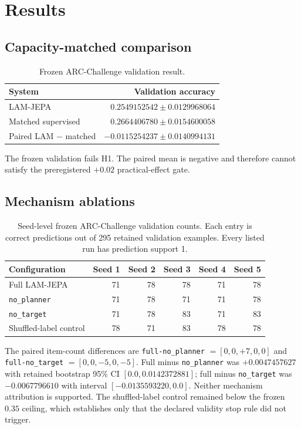 \documentclass{article}
\begin{document}
\section{Results}
\subsection{Capacity-matched comparison}
\begin{table}[t]
\centering
\caption{Frozen ARC-Challenge validation result.}
\begin{tabular}{lr}
\toprule
System & Validation accuracy \\
\midrule
LAM-JEPA & $0.2549152542 \pm 0.0129968064$ \\
Matched supervised & $0.2664406780 \pm 0.0154600058$ \\
Paired LAM $-$ matched & $-0.0115254237 \pm 0.0140994131$ \\
\bottomrule
\end{tabular}
\end{table}
The frozen validation fails H1. The paired mean is negative and therefore cannot satisfy the preregistered $+0.02$ practical-effect gate.

\subsection{Mechanism ablations}
\begin{table}[t]
\centering
\caption{Seed-level frozen ARC-Challenge validation counts. Each entry is correct predictions out of 295 retained validation examples. Every listed run has prediction support 1.}
\begin{tabular}{lrrrrr}
\toprule
Configuration & Seed 1 & Seed 2 & Seed 3 & Seed 4 & Seed 5 \\
\midrule
Full LAM-JEPA & 71 & 78 & 78 & 71 & 78 \\
\texttt{no\_planner} & 71 & 78 & 71 & 71 & 78 \\
\texttt{no\_target} & 71 & 78 & 83 & 71 & 83 \\
Shuffled-label control & 78 & 71 & 83 & 78 & 78 \\
\bottomrule
\end{tabular}
\end{table}

The paired item-count differences are \texttt{full-no\_planner} $=[0,0,+7,0,0]$ and \texttt{full-no\_target} $=[0,0,-5,0,-5]$. Full minus \texttt{no\_planner} was $+0.0047457627$ with retained bootstrap 95\% CI $[0.0, 0.0142372881]$; full minus \texttt{no\_target} was $-0.0067796610$ with interval $[-0.0135593220,0.0]$. Neither mechanism attribution is supported. The shuffled-label control remained below the frozen $0.35$ ceiling, which establishes only that the declared validity stop rule did not trigger.
\end{document}
